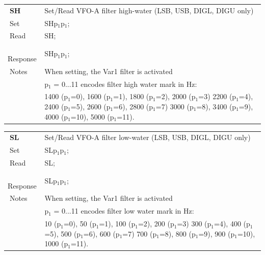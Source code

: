 \documentclass[12pt]{book}
\begin{document}
\begin{center}
\begin{tabular}{|p{2cm}|p{11cm}|}
\toprule
$\phantom{\Big|}$\textbf{\large SH} & Set/Read VFO-A filter high-water (LSB, USB, DIGL, DIGU only) \\\cline{1-2}
$\phantom{\Big|}${\large Set} & {SHp$_1$p$_1$;} \\\hline
$\phantom{\Big|}${\large Read} & {SH;} \\\hline
$\phantom{\Big|}${\large Response} & {SHp$_1$p$_1$;} \\\hline
$\phantom{\Big|}${\large Notes} & \multicolumn{1}{|p{11cm}|}{When setting, the Var1 filter is activated} \\
 & \multicolumn{1}{|p{11cm}|}{p$_1$ = 0...11 encodes filter high water mark in Hz:} \\
 & \multicolumn{1}{|p{11cm}|}{1400 (p$_1$=0), 1600 (p$_1$=1), 1800 (p$_1$=2), 2000 (p$_1$=3) 2200 (p$_1$=4), 2400 (p$_1$=5), 2600 (p$_1$=6), 2800 (p$_1$=7) 3000 (p$_1$=8), 3400 (p$_1$=9), 4000 (p$_1$=10), 5000 (p$_1$=11).} \\
\bottomrule
\end{tabular}
\end{center}

\begin{center}
\begin{tabular}{|p{2cm}|p{11cm}|}
\toprule
$\phantom{\Big|}$\textbf{\large SL} & Set/Read VFO-A filter low-water (LSB, USB, DIGL, DIGU only) \\\cline{1-2}
$\phantom{\Big|}${\large Set} & {SLp$_1$p$_1$;} \\\hline
$\phantom{\Big|}${\large Read} & {SL;} \\\hline
$\phantom{\Big|}${\large Response} & {SLp$_1$p$_1$;} \\\hline
$\phantom{\Big|}${\large Notes} & \multicolumn{1}{|p{11cm}|}{When setting, the Var1 filter is activated} \\
 & \multicolumn{1}{|p{11cm}|}{p$_1$ = 0...11 encodes filter low water mark in Hz:} \\
 & \multicolumn{1}{|p{11cm}|}{10 (p$_1$=0), 50 (p$_1$=1), 100 (p$_1$=2), 200 (p$_1$=3) 300 (p$_1$=4), 400 (p$_1$=5), 500 (p$_1$=6), 600 (p$_1$=7) 700 (p$_1$=8), 800 (p$_1$=9), 900 (p$_1$=10), 1000 (p$_1$=11).} \\
\bottomrule
\end{tabular}
\end{center}
\end{document}
